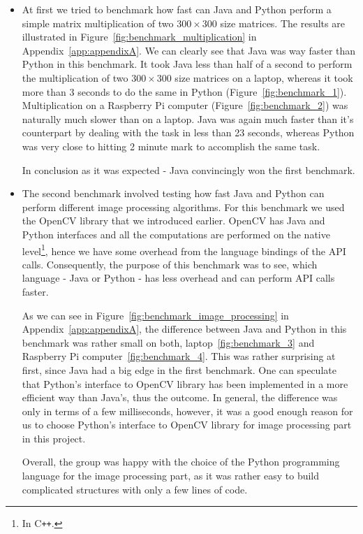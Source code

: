 \begin{itemize}
\item At first we tried to benchmark how fast can Java and Python perform a simple matrix multiplication of two $300 \times 300$ size matrices. The results are illustrated in Figure~\ref{fig:benchmark_multiplication} in Appendix~\ref{app:appendixA}. We can clearly see that Java was way faster than Python in this benchmark. It took Java less than half of a second to perform the multiplication of two $300 \times 300$ size matrices on a laptop, whereas it took more than 3 seconds to do the same in Python (Figure~\ref{fig:benchmark_1}). Multiplication on a Raspberry Pi computer (Figure~\ref{fig:benchmark_2}) was naturally much slower than on a laptop. Java was again much faster than it's counterpart by dealing with the task in less than 23 seconds, whereas Python was very close to hitting 2 minute mark to accomplish the same task.

In conclusion as it was expected - Java convincingly won the first benchmark.

\item The second benchmark involved testing how fast Java and Python can perform different image processing algorithms. For this benchmark we used the OpenCV library that we introduced earlier. OpenCV has Java and Python interfaces and all the computations are performed on the native level\footnote{In C\texttt{++}.}, hence we have some overhead from the language bindings of the API calls. Consequently, the purpose of this benchmark was to see, which language - Java or Python - has less overhead and can perform API calls faster. 

As we can see in Figure~\ref{fig:benchmark_image_processing} in Appendix~\ref{app:appendixA}, the difference between Java and Python in this benchmark was rather small on both, laptop~\ref{fig:benchmark_3} and Raspberry Pi computer~\ref{fig:benchmark_4}. This was rather surprising at first, since Java had a big edge in the first benchmark. One can speculate that Python's interface to OpenCV library has been implemented in a more efficient way than Java's, thus the outcome. In general, the difference was only in terms of a few milliseconds, however, it was a good enough reason for us to choose Python's interface to OpenCV library for image processing part in this project.

Overall, the group was happy with the choice of the Python programming language for the image processing part, as it was rather easy to build complicated structures with only a few lines of code.
\end{itemize}